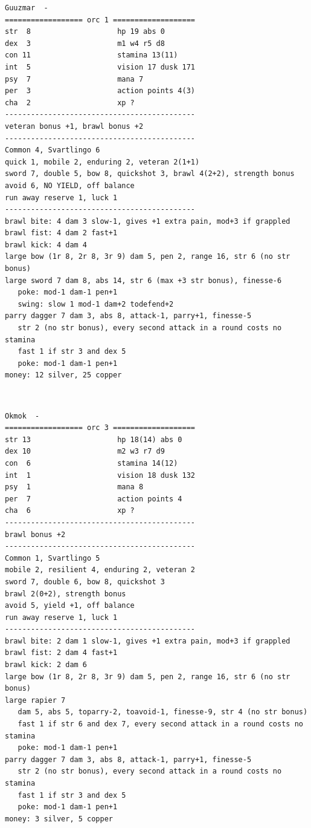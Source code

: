 \clearpage
\begin{samepage} \small \begin{verbatim}
Guuzmar  -
================== orc 1 ===================
str  8                    hp 19 abs 0
dex  3                    m1 w4 r5 d8
con 11                    stamina 13(11)
int  5                    vision 17 dusk 171
psy  7                    mana 7
per  3                    action points 4(3)
cha  2                    xp ?
--------------------------------------------
veteran bonus +1, brawl bonus +2
--------------------------------------------
Common 4, Svartlingo 6
quick 1, mobile 2, enduring 2, veteran 2(1+1)
sword 7, double 5, bow 8, quickshot 3, brawl 4(2+2), strength bonus
avoid 6, NO YIELD, off balance
run away reserve 1, luck 1
--------------------------------------------
brawl bite: 4 dam 3 slow-1, gives +1 extra pain, mod+3 if grappled
brawl fist: 4 dam 2 fast+1
brawl kick: 4 dam 4
large bow (1r 8, 2r 8, 3r 9) dam 5, pen 2, range 16, str 6 (no str bonus)
large sword 7 dam 8, abs 14, str 6 (max +3 str bonus), finesse-6
   poke: mod-1 dam-1 pen+1
   swing: slow 1 mod-1 dam+2 todefend+2
parry dagger 7 dam 3, abs 8, attack-1, parry+1, finesse-5
   str 2 (no str bonus), every second attack in a round costs no stamina
   fast 1 if str 3 and dex 5
   poke: mod-1 dam-1 pen+1
money: 12 silver, 25 copper
\end{verbatim} \normalsize \end{samepage}

\


\clearpage
\begin{samepage} \small \begin{verbatim}
Okmok  -
================== orc 3 ===================
str 13                    hp 18(14) abs 0
dex 10                    m2 w3 r7 d9
con  6                    stamina 14(12)
int  1                    vision 18 dusk 132
psy  1                    mana 8
per  7                    action points 4
cha  6                    xp ?
--------------------------------------------
brawl bonus +2
--------------------------------------------
Common 1, Svartlingo 5
mobile 2, resilient 4, enduring 2, veteran 2
sword 7, double 6, bow 8, quickshot 3
brawl 2(0+2), strength bonus
avoid 5, yield +1, off balance
run away reserve 1, luck 1
--------------------------------------------
brawl bite: 2 dam 1 slow-1, gives +1 extra pain, mod+3 if grappled
brawl fist: 2 dam 4 fast+1
brawl kick: 2 dam 6
large bow (1r 8, 2r 8, 3r 9) dam 5, pen 2, range 16, str 6 (no str bonus)
large rapier 7
   dam 5, abs 5, toparry-2, toavoid-1, finesse-9, str 4 (no str bonus)
   fast 1 if str 6 and dex 7, every second attack in a round costs no stamina
   poke: mod-1 dam-1 pen+1
parry dagger 7 dam 3, abs 8, attack-1, parry+1, finesse-5
   str 2 (no str bonus), every second attack in a round costs no stamina
   fast 1 if str 3 and dex 5
   poke: mod-1 dam-1 pen+1
money: 3 silver, 5 copper
\end{verbatim} \normalsize \end{samepage}

